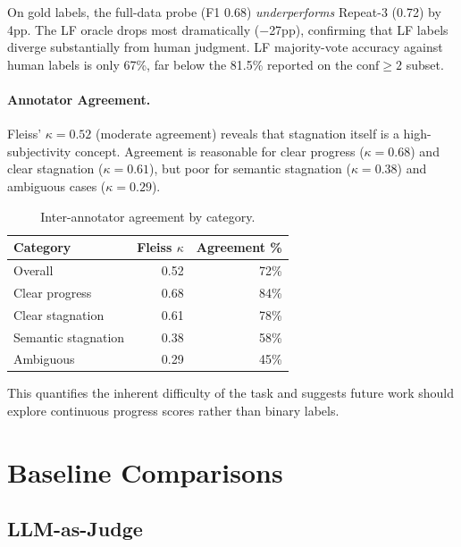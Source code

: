 \documentclass[11pt]{article}
\begin{document}
On gold labels, the full-data probe (F1 0.68) \emph{underperforms} Repeat-3 (0.72) by 4pp.
The LF oracle drops most dramatically ($-$27pp), confirming that LF labels diverge substantially from human judgment.
LF majority-vote accuracy against human labels is only 67\%, far below the 81.5\% reported on the $\text{conf}\!\geq\!2$ subset.

\paragraph{Annotator Agreement.}
Fleiss' $\kappa = 0.52$ (moderate agreement) reveals that stagnation itself is a high-subjectivity concept.
Agreement is reasonable for clear progress ($\kappa\!=\!0.68$) and clear stagnation ($\kappa\!=\!0.61$), but poor for semantic stagnation ($\kappa\!=\!0.38$) and ambiguous cases ($\kappa\!=\!0.29$).

\begin{table}[h]
\centering
\caption{Inter-annotator agreement by category.}
\label{tab:agreement}
\begin{tabular}{lrr}
\toprule
\textbf{Category} & \textbf{Fleiss $\kappa$} & \textbf{Agreement \%} \\
\midrule
Overall & 0.52 & 72\% \\
Clear progress & 0.68 & 84\% \\
Clear stagnation & 0.61 & 78\% \\
Semantic stagnation & 0.38 & 58\% \\
Ambiguous & 0.29 & 45\% \\
\bottomrule
\end{tabular}
\end{table}

This quantifies the inherent difficulty of the task and suggests future work should explore continuous progress scores rather than binary labels.

\section{Baseline Comparisons}
\label{sec:baselines}

\subsection{LLM-as-Judge}
\label{sec:llm_judge}
\end{document}
